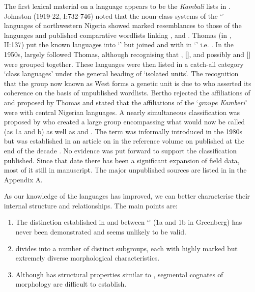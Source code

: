\documentclass[output=paper]{langsci/langscibook}
\begin{document}
\newpage 
The first lexical material on a  language appears to be the \textit{Kambali} lists in \citet{Koelle1854}. Johnston (1919-22, I:732-746) noted that the noun-class systems of the ‘’ languages of northwestern Nigeria showed marked resemblances to those of the  languages and published comparative wordlists linking ,  and . Thomas (in \citealt{Meek1925}, II:137) put the known  languages into ‘’ but joined  and  with  in ‘’ i.e. . In the 1950s,    \citet[70]{WestermannBryan1952} largely followed Thomas, although recognising that ,  [], and possibly  and  [] were grouped together. These languages were then listed in a catch-all category ‘class languages’ under the general heading of ‘isolated units’. The recognition that the group now known as West  forms a genetic unit is due to \citet[264-6]{Bertho1952} who asserted its coherence on the basis of unpublished wordlists. Bertho rejected the  affiliations of  and  proposed by Thomas and stated that the affiliations of the ‘\textit{groupe Kamberi}’ were with central Nigerian  languages. A nearly simultaneous classification was proposed by \citet{Greenberg1955} who created a large  group encompassing what would now be called  (as  1a and b) as well as  and . The term  was informally introduced in the 1980s but was established in an article on  in the reference volume on  published at the end of the decade \citep{Gerhardt1989}. No evidence was put forward to support the classification published. Since that date there has been a significant expansion of field data, most of it still in manuscript. The major unpublished sources are listed in  in the Appendix A.

As our knowledge of the  languages has improved, we can better characterise their internal structure and relationships. The main points are:

\begin{enumerate}
\item  The distinction established in \citet{Rowlands1962} and \citet{Greenberg1963} between ‘’ (1a and 1b in Greenberg) has never been demonstrated and seems unlikely to be valid.
\item  {} divides into a number of distinct subgroups, each with highly marked but extremely diverse morphological characteristics.
\item  Although  has structural properties similar to , segmental cognates of morphology are difficult to establish.
\end{enumerate}
\end{document}
